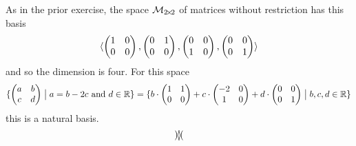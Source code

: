 \begin{exercises}
\begin{exparts*}
    \end{exparts*}
    \begin{answer}
     \begin{exparts}
      \partsitem As in the prior exercise, the space $\mathcal{M}_{2 \! \times \! 2}$ 
        of matrices without restriction has this basis
        \begin{equation*}
         \langle
           \begin{pmatrix}
             1  &0  \\
             0  &0
           \end{pmatrix},
           \begin{pmatrix}
             0  &1  \\
             0  &0
           \end{pmatrix},
           \begin{pmatrix}
             0  &0  \\
             1  &0
           \end{pmatrix},
           \begin{pmatrix}
             0  &0  \\
             0  &1
           \end{pmatrix}  \rangle
        \end{equation*}
        and so the dimension is four.
      \partsitem For this space
        \begin{equation*}
         \mbox{$\{\begin{pmatrix}
               a  &b  \\
               c  &d
             \end{pmatrix} \bigm| \text{$a=b-2c$ and $d\in\mathbb{R}$}\}$}
         =\mbox{$\{b\cdot\begin{pmatrix}
             1  &1  \\
             0  &0
           \end{pmatrix}
           +c\cdot\begin{pmatrix}
             -2  &0  \\
              1  &0
           \end{pmatrix}
           +d\cdot\begin{pmatrix}
             0  &0  \\
             0  &1
           \end{pmatrix} \bigm| b,c,d\in\mathbb{R}\}$}
        \end{equation*}
        this is a natural basis.
        \begin{equation*}
          \langle
            \begin{pmatrix}

\end{pmatrix}\rangle
\end{equation*}
\end{exparts}
\end{answer}
\end{exercises}
